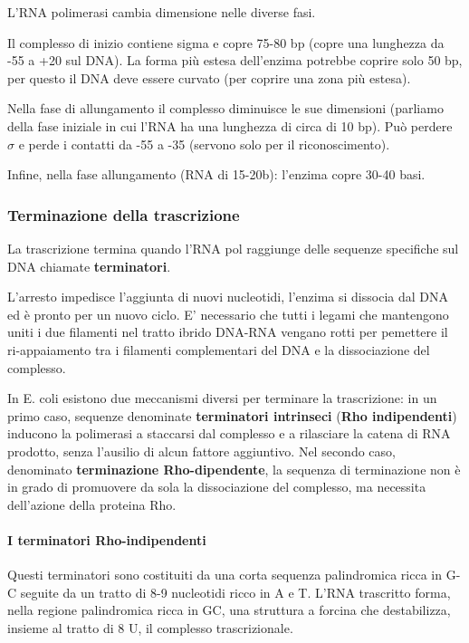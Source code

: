\documentclass[]{article}
\begin{document}
L'RNA polimerasi cambia dimensione nelle diverse fasi.

Il complesso di inizio contiene sigma e copre 75-80 bp (copre una
lunghezza da -55 a +20 sul DNA). La forma più estesa dell'enzima
potrebbe coprire solo 50 bp, per questo il DNA deve essere curvato (per
coprire una zona più estesa).

Nella fase di allungamento il complesso diminuisce le sue dimensioni
(parliamo della fase iniziale in cui l'RNA ha una lunghezza di circa di
10 bp). Può perdere \(\sigma\) e perde i contatti da -55 a -35 (servono
solo per il riconoscimento).

Infine, nella fase allungamento (RNA di 15-20b): l'enzima copre 30-40
basi.

\subsubsection{Terminazione della
trascrizione}\label{terminazione-della-trascrizione}

La trascrizione termina quando l'RNA pol raggiunge delle sequenze
specifiche sul DNA chiamate \textbf{terminatori}.

L'arresto impedisce l'aggiunta di nuovi nucleotidi, l'enzima si dissocia
dal DNA ed è pronto per un nuovo ciclo. E' necessario che tutti i legami
che mantengono uniti i due filamenti nel tratto ibrido DNA-RNA vengano
rotti per pemettere il ri-appaiamento tra i filamenti complementari del
DNA e la dissociazione del complesso.

In E. coli esistono due meccanismi diversi per terminare la
trascrizione: in un primo caso, sequenze denominate \textbf{terminatori
intrinseci} (\textbf{Rho indipendenti}) inducono la polimerasi a
staccarsi dal complesso e a rilasciare la catena di RNA prodotto, senza
l'ausilio di alcun fattore aggiuntivo. Nel secondo caso, denominato
\textbf{terminazione Rho-dipendente}, la sequenza di terminazione non è
in grado di promuovere da sola la dissociazione del complesso, ma
necessita dell'azione della proteina Rho.

\paragraph{I terminatori
Rho-indipendenti}\label{i-terminatori-rho-indipendenti}

Questi terminatori sono costituiti da una corta sequenza palindromica
ricca in G-C seguite da un tratto di 8-9 nucleotidi ricco in A e T.
L'RNA trascritto forma, nella regione palindromica ricca in GC, una
struttura a forcina che destabilizza, insieme al tratto di 8 U, il
complesso trascrizionale.
\end{document}
